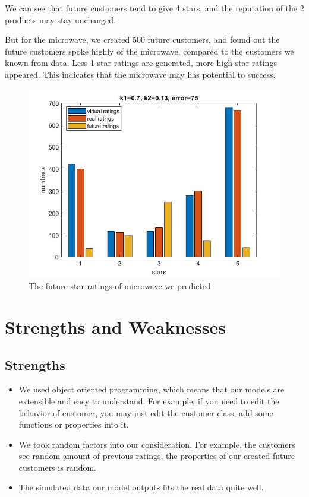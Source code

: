 \documentclass[12pt]{article}  %
\begin{document}
We can see that future customers tend to give 4 stars, and the reputation of the 2 products may stay unchanged.

But for the microwave, we created 500 future customers, and found out the future customers spoke highly of the microwave, compared to the customers we known from data. Less 1 star ratings are generated, more high star ratings appeared. This indicates that the microwave may has potential to success.
\begin{figure}[H]
  \centering
  \includegraphics[width=0.7\linewidth]{Q3picture/microwave.jpg}
  \caption{The future star ratings of microwave we predicted}
  \label{fig:}
\end{figure}



\section{Strengths and Weaknesses}
\subsection{Strengths}
\begin{itemize}
\item We used object oriented programming, which means that our models are extensible and easy to understand. For example, if you need to edit the behavior of customer, you may just edit the customer class, add some functions or properties into it.
  \item We took random factors into our consideration. For example, the customers see random amount of previous ratings, the properties of our created future customers is random.
    \item The simulated data our model outputs fits the real data quite well.
\end{itemize}
\end{document}
